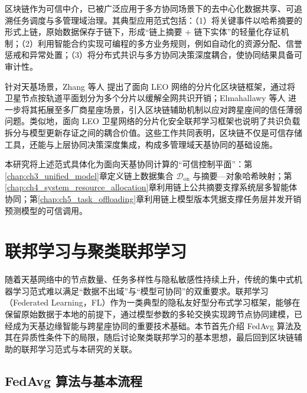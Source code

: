 区块链作为可信中介，已被广泛应用于多方协同场景下的去中心化数据共享、可追溯任务调度与多管理域治理。其典型应用范式包括：（1）将关键事件以哈希摘要的形式上链，原始数据保存于链下，形成“链上摘要 + 链下实体”的轻量化存证机制；（2）利用智能合约实现可编程的多方业务规则，例如自动化的资源分配、信誉惩戒和异常处置；（3）将分布式共识与多方协同决策深度耦合，使协同结果具备可审计性\cite{Feng2022,Moscato2023,ETSI2024BCFL,Elmahallawy2025}。

针对天基场景，Zhang 等人\cite{ZhangLEO2024} 提出了面向 LEO 网络的分片化区块链框架，通过将卫星节点按轨道平面划分为多个分片以缓解全网共识开销；Elmahallawy 等人\cite{Elmahallawy2025} 进一步将其拓展至多厂商星座场景，引入区块链辅助机制以应对跨星座间的信任薄弱问题。类似地，面向 LEO 卫星网络的分片化安全联邦学习框架也说明了共识负载拆分与模型更新存证之间的耦合价值\cite{ref29}。这些工作共同表明，区块链不仅是可信存储工具，还能与上层协同决策深度集成，构成多管理域天基协同的基础设施。

本研究将上述范式具体化为面向天基协同计算的“可信控制平面”：第\ref{chap:ch3_unified_model}章定义链上数据集合 $\mathcal{D}_{\mathrm{on}}$ 与摘要—对象哈希映射；第\ref{chap:ch4_system_resource_allocation}章利用链上公共摘要支撑系统层多智能体协同；第\ref{chap:ch5_task_offloading}章利用链上模型版本凭据支撑任务层并发开销预测模型的可信调用。

\section{联邦学习与聚类联邦学习}
\label{sec:ch2_federated_learning}

随着天基网络中的节点数量、任务多样性与隐私敏感性持续上升，传统的集中式机器学习范式难以满足“数据不出域”与“模型可协同”的双重要求。联邦学习（Federated Learning，FL）作为一类典型的隐私友好型分布式学习框架，能够在保留原始数据于本地的前提下，通过模型参数的多轮交换实现跨节点协同建模，已经成为天基边缘智能与跨星座协同的重要技术基础\cite{McMahan2017,Bonawitz2019,LiFedAvg2020,Li2020FederatedChallenges,Kairouz2021Advances}。本节首先介绍 FedAvg 算法及其在异质性条件下的局限，随后讨论聚类联邦学习的基本思想，最后回到区块链辅助的联邦学习范式与本研究的关联。

\subsection{FedAvg 算法与基本流程}
\label{subsec:ch2_fedavg}

